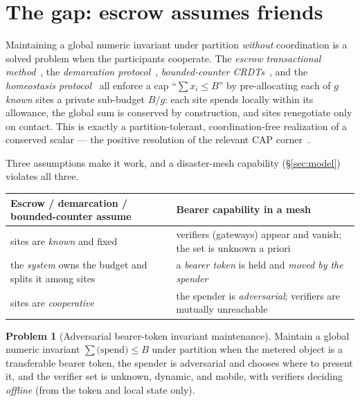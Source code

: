 \documentclass[11pt]{article}
\theoremstyle{plain}
\theoremstyle{definition}
\newtheorem{problem}{Problem}
\begin{document}
\tableofcontents

\section{The gap: escrow assumes friends}\label{sec:gap}

Maintaining a global numeric invariant under partition \emph{without} coordination
is a solved problem when the participants cooperate. The \emph{escrow transactional
method}~\cite{ONeil1986Escrow}, the \emph{demarcation
protocol}~\cite{Barbara1994Demarcation}, \emph{bounded-counter
CRDTs}~\cite{Balegas2015BoundedCounter}, and the \emph{homeostasis
protocol}~\cite{Roy2015Homeostasis} all enforce a cap ``$\sum x_i \le B$'' by
pre-allocating each of $g$ \emph{known} sites a private sub-budget $B/g$: each site
spends locally within its allowance, the global sum is conserved by construction,
and sites renegotiate only on contact. This is exactly a
partition-tolerant, coordination-free realization of a conserved scalar --- the
positive resolution of the relevant CAP corner~\cite{GilbertLynch2002,Abadi2012PACELC,
Rahman2017PCAP}.

Three assumptions make it work, and a disaster-mesh capability
(\S\ref{sec:model}) violates all three.

\begin{center}
\begin{tabular}{@{}p{5.6cm}p{7.4cm}@{}}
\toprule
\textbf{Escrow / demarcation / bounded-counter assume} & \textbf{Bearer capability in a mesh} \\
\midrule
sites are \emph{known} and fixed & verifiers (gateways) appear and vanish; the set is unknown a priori \\
the \emph{system} owns the budget and splits it among sites & a \emph{bearer token} is held and \emph{moved by the spender} \\
sites are \emph{cooperative} & the spender is \emph{adversarial}; verifiers are mutually unreachable \\
\bottomrule
\end{tabular}
\end{center}

\begin{problem}[Adversarial bearer-token invariant maintenance]\label{prob:main}
Maintain a global numeric invariant $\sum \text{(spend)} \le B$ under partition
when the metered object is a transferable bearer token, the spender is adversarial
and chooses where to present it, and the verifier set is unknown, dynamic, and
mobile, with verifiers deciding \emph{offline} (from the token and local state
only).
\end{problem}
\end{document}
